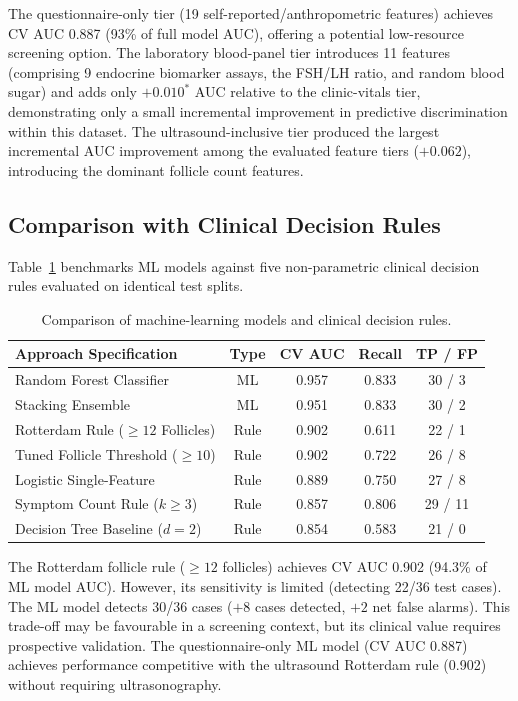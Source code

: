 \documentclass[10pt,twocolumn,a4paper]{article}
\begin{document}
The questionnaire-only tier (19 self-reported/anthropometric features) achieves CV AUC 0.887 (93\% of full model AUC), offering a potential low-resource screening option.
The laboratory blood-panel tier introduces 11 features (comprising 9 endocrine biomarker assays, the FSH/LH ratio, and random blood sugar) and adds only $+0.010^*$ AUC relative to the clinic-vitals tier, demonstrating only a small incremental improvement in predictive discrimination within this dataset.
The ultrasound-inclusive tier produced the largest incremental AUC improvement among the evaluated feature tiers ($+0.062$), introducing the dominant follicle count features.

\subsection{Comparison with Clinical Decision Rules}
Table~\ref{tab:clinical} benchmarks ML models against five non-parametric clinical decision rules evaluated on identical test splits.

\begin{table}[htbp]
\centering
\caption{Comparison of machine-learning models and clinical decision rules.}
\label{tab:clinical}
\vspace{2pt}
\setlength{\tabcolsep}{2pt}
\small
\begin{tabular}{@{}p{3.1cm} c c c c@{}}
\toprule
Approach Specification & Type & CV AUC & Recall & TP / FP \\
\midrule
Random Forest Classifier & ML & 0.957 & 0.833 & 30 / 3 \\
Stacking Ensemble        & ML & 0.951 & 0.833 & 30 / 2 \\
\midrule
Rotterdam Rule ($\ge 12$ Follicles) & Rule & 0.902 & 0.611 & 22 / 1 \\
Tuned Follicle Threshold ($\ge 10$) & Rule & 0.902 & 0.722 & 26 / 8 \\
Logistic Single-Feature & Rule & 0.889 & 0.750 & 27 / 8 \\
Symptom Count Rule ($k \ge 3$)     & Rule & 0.857 & 0.806 & 29 / 11 \\
Decision Tree Baseline ($d=2$)      & Rule & 0.854 & 0.583 & 21 / 0 \\
\bottomrule
\end{tabular}
\end{table}

The Rotterdam follicle rule ($\ge 12$ follicles) achieves CV AUC 0.902 (94.3\% of ML model AUC).
However, its sensitivity is limited (detecting 22/36 test cases).  The ML model detects 30/36 cases ($+8$ cases detected, $+2$ net false alarms).
This trade-off may be favourable in a screening context, but its clinical value requires prospective validation.
The questionnaire-only ML model (CV AUC 0.887) achieves performance competitive with the ultrasound Rotterdam rule (0.902) without requiring ultrasonography.
\end{document}
